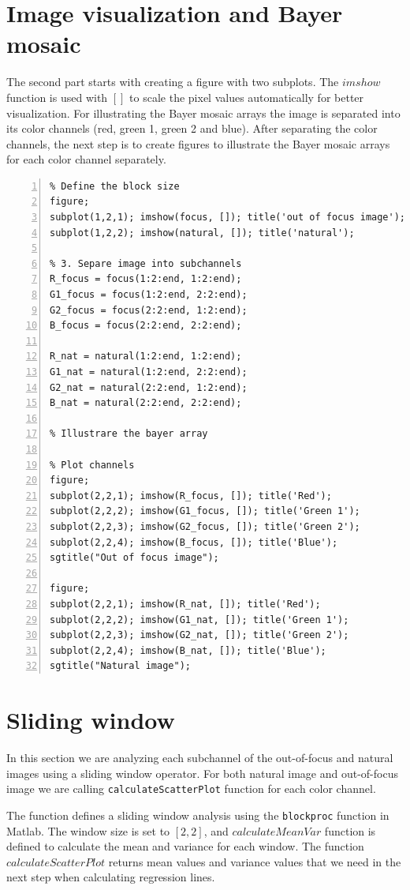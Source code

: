 \documentclass[12pt,a4paper,english
]{tunithesis}
\begin{document}
\section{Image visualization and Bayer mosaic}
The second part starts with creating a figure with two subplots. The $imshow$ function is used with $[]$ to scale the pixel values automatically for better visualization. For illustrating the Bayer mosaic arrays the image is separated into its color channels (red, green 1, green 2 and blue). After separating the color channels, the next step is to create figures to illustrate the Bayer mosaic arrays for each color channel separately.
\begin{lstlisting}[style=Matlab-editor, numbers=left, basicstyle=\small]
% 2. Visualize Images, Bayer mosaic array
% Define the block size
figure;
subplot(1,2,1); imshow(focus, []); title('out of focus image');
subplot(1,2,2); imshow(natural, []); title('natural');

% 3. Separe image into subchannels
R_focus = focus(1:2:end, 1:2:end);
G1_focus = focus(1:2:end, 2:2:end);
G2_focus = focus(2:2:end, 1:2:end);
B_focus = focus(2:2:end, 2:2:end);

R_nat = natural(1:2:end, 1:2:end);
G1_nat = natural(1:2:end, 2:2:end);
G2_nat = natural(2:2:end, 1:2:end);
B_nat = natural(2:2:end, 2:2:end);

% Illustrare the bayer array

% Plot channels
figure;
subplot(2,2,1); imshow(R_focus, []); title('Red');
subplot(2,2,2); imshow(G1_focus, []); title('Green 1');
subplot(2,2,3); imshow(G2_focus, []); title('Green 2');
subplot(2,2,4); imshow(B_focus, []); title('Blue');
sgtitle("Out of focus image");

figure;
subplot(2,2,1); imshow(R_nat, []); title('Red');
subplot(2,2,2); imshow(G1_nat, []); title('Green 1');
subplot(2,2,3); imshow(G2_nat, []); title('Green 2');
subplot(2,2,4); imshow(B_nat, []); title('Blue');
sgtitle("Natural image");
\end{lstlisting}
\section{Sliding window}
In this section we are analyzing each subchannel of the out-of-focus and natural images using a sliding window operator. For both natural image and out-of-focus image we are calling \texttt{calculateScatterPlot} function for each color channel.

The function defines a sliding window analysis using the \texttt{blockproc} function in Matlab. The window size is set to $[2, 2]$, and $calculateMeanVar$ function is defined to calculate the mean and variance for each window. The function $calculateScatterPlot$ returns mean values and variance values that we need in the next step when calculating regression lines.
\end{document}
